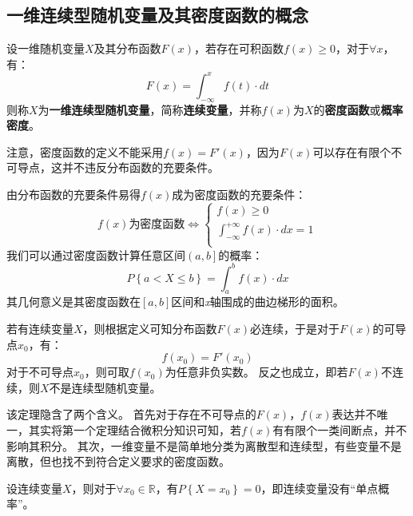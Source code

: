 \subsection{一维连续型随机变量及其密度函数的概念}

\begin{definition}[一维连续型随机变量]
设一维随机变量$X$及其分布函数$F\left( x \right) $，若存在可积函数$f\left( x \right) \geqslant 0$，对于$\forall x$，有：
\[
F\left( x \right) =\int_{-\infty}^x{f\left( t \right) \cdot dt}
\]
则称$X$为{\bf 一维连续型随机变量}，简称{\bf 连续变量}，并称$f\left( x \right) $为$X$的{\bf 密度函数}或{\bf 概率密度}。
\end{definition}

\begin{tcolorbox}
注意，密度函数的定义不能采用$f\left( x \right) =F'\left( x \right) $，因为$F\left( x \right) $可以存在有限个不可导点，这并不违反分布函数的充要条件。
\end{tcolorbox}

由分布函数的充要条件易得$f\left( x \right) $成为密度函数的充要条件：
\[
f\left( x \right) \text{为密度函数}\Leftrightarrow \begin{cases}
	f\left( x \right) \geqslant 0\\
	\int_{-\infty}^{+\infty}{f\left( x \right) \cdot dx}=1\\
\end{cases}
\]
我们可以通过密度函数计算任意区间$\left( a,b \right] $的概率：
\[
P\left\{ a<X\leqslant b \right\} =\int_a^b{f\left( x \right) \cdot dx}
\]
其几何意义是其密度函数在$\left[ a,b \right] $区间和\textit{x}轴围成的曲边梯形的面积。

\begin{theorem}
若有连续变量$X$，则根据定义可知分布函数$F\left( x \right) $必连续，于是对于$F\left( x \right) $的可导点$x_0$，有：
\[
f\left( x_0 \right) =F'\left( x_0 \right)
\]
对于不可导点$x_0$，则可取$f\left( x_0 \right) $为任意非负实数。
反之也成立，即若$F\left( x \right) $不连续，则$X$不是连续型随机变量。
\end{theorem}

该定理隐含了两个含义。
首先对于存在不可导点的$F\left( x \right) $，$f\left( x \right) $表达并不唯一，其实将第一个定理结合微积分知识可知，若$f\left( x \right) $有有限个一类间断点，并不影响其积分。
其次，一维变量不是简单地分类为离散型和连续型，有些变量不是离散，但也找不到符合定义要求的密度函数。

\begin{theorem}
设连续变量$X$，则对于$\forall x_0\in \mathbb{R} $，有$P\left\{ X=x_0 \right\} =0$，即连续变量没有“单点概率”。
\end{theorem}

